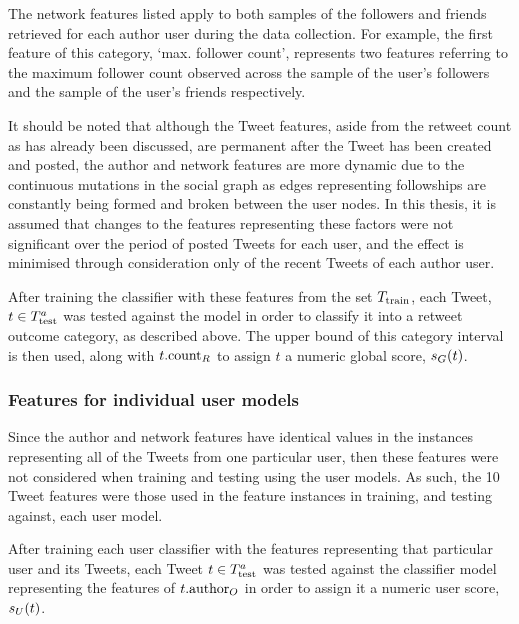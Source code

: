 The network features listed apply to both samples of the followers and friends retrieved for each author user during the data collection. For example, the first feature of this category, `max. follower count', represents two features referring to the maximum follower count observed across the sample of the user's followers and the sample of the user's friends respectively.

It should be noted that although the Tweet features, aside from the retweet count as has already been discussed, are permanent after the Tweet has been created and posted, the author and network features are more dynamic due to the continuous mutations in the social graph as edges representing followships are constantly being formed and broken between the user nodes. In this thesis, it is assumed that changes to the features representing these factors were not significant over the period of posted Tweets for each user, and the effect is minimised through consideration only of the recent Tweets of each author user.

After training the classifier with these features from the set $T_{\textrm{train}}{}$, each Tweet, $t \in T^a_{\textrm{test}}{}$ was tested against the model in order to classify it into a retweet outcome category, as described above. The upper bound of this category interval is then used, along with $t.\textrm{count}_R$ to assign $t$ a numeric global score, $s_G(t)$.


\subsubsection{Features for individual user models}
Since the author and network features have identical values in the instances representing all of the Tweets from one particular user, then these features were not considered when training and testing using the user models. As such, the 10 Tweet features were those used in the feature instances in training, and testing against, each user model.

After training each user classifier with the features representing that particular user and its Tweets, each Tweet $t \in T^a_{\textrm{test}}{}$ was tested against the classifier model representing the features of $t.\textrm{author}_O$ in order to assign it a numeric user score, $s_U(t)$.  


